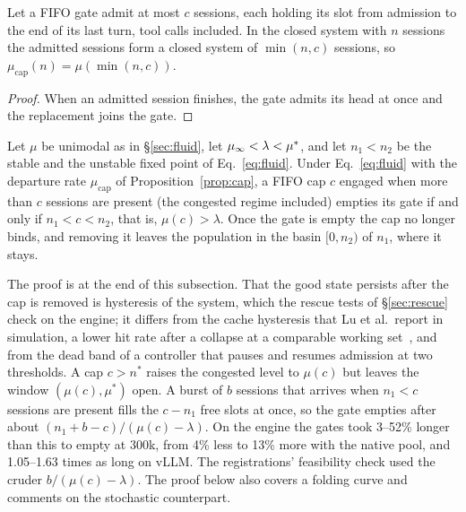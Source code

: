 \begin{proposition}\label{prop:cap}
Let a FIFO gate admit at most $c$ sessions, each holding its slot from admission to the end of its last turn, tool calls included. In the closed system with $n$ sessions the admitted sessions form a closed system of $\min(n,c)$ sessions, so $\mu_{\mathrm{cap}}(n)=\mu(\min(n,c))$.
\end{proposition}
\begin{proof}
When an admitted session finishes, the gate admits its head at once and the replacement joins the gate.
\end{proof}

\begin{corollary}\label{cor:rescue}
Let $\mu$ be unimodal as in \S\ref{sec:fluid}, let $\mu_{\infty}<\lambda<\mu^*$, and let $n_1<n_2$ be the stable and the unstable fixed point of Eq.~\eqref{eq:fluid}. Under Eq.~\eqref{eq:fluid} with the departure rate $\mu_{\mathrm{cap}}$ of Proposition~\ref{prop:cap}, a FIFO cap $c$ engaged when more than $c$ sessions are present (the congested regime included) empties its gate if and only if $n_1<c<n_2$, that is, $\mu(c)>\lambda$. Once the gate is empty the cap no longer binds, and removing it leaves the population in the basin $[0,n_2)$ of $n_1$, where it stays.
\end{corollary}
The proof is at the end of this subsection. That the good state persists after the cap is removed is hysteresis of the system, which the rescue tests of \S\ref{sec:rescue} check on the engine; it differs from the cache hysteresis that Lu et al.\ report in simulation, a lower hit rate after a collapse at a comparable working set~\citep{lu2026cachetrap}, and from the dead band of a controller that pauses and resumes admission at two thresholds. A cap $c>n^*$ raises the congested level to $\mu(c)$ but leaves the window $(\mu(c),\mu^*)$ open. A burst of $b$ sessions that arrives when $n_1<c$ sessions are present fills the $c-n_1$ free slots at once, so the gate empties after about $(n_1+b-c)/(\mu(c)-\lambda)$. On the engine the gates took 3--52\% longer than this to empty at 300k, from 4\% less to 13\% more with the native pool, and 1.05--1.63 times as long on vLLM. The registrations' feasibility check used the cruder $b/(\mu(c)-\lambda)$. The proof below also covers a folding curve and comments on the stochastic counterpart.

